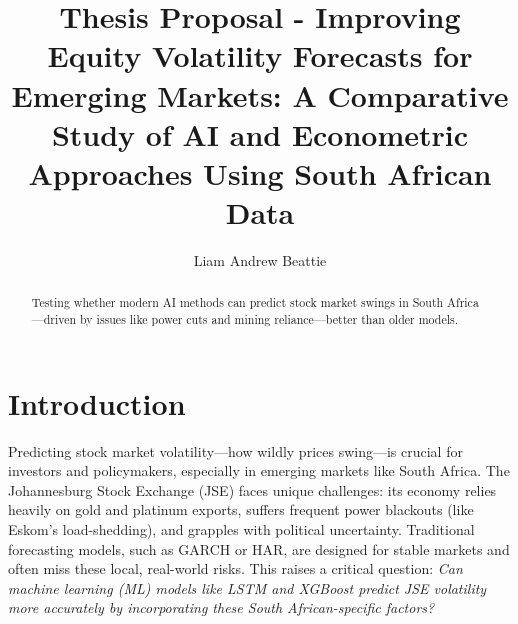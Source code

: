 \documentclass[11pt,preprint]{elsarticle}
\numberwithin{equation}{section}
\numberwithin{figure}{section}
\numberwithin{table}{section}
\begin{document}
\begin{frontmatter}  %

\title{Thesis Proposal - Improving Equity Volatility Forecasts for
Emerging Markets: A Comparative Study of AI and Econometric Approaches
Using South African Data}





\author[Add1]{Liam Andrew Beattie}





\address[Add1]{Stellenbosch University, South Africa}


\begin{abstract}
\small{
Testing whether modern AI methods can predict stock market swings in
South Africa---driven by issues like power cuts and mining
reliance---better than older models.
}
\end{abstract}

\vspace{1cm}





\vspace{0.5cm}

\end{frontmatter}

\setcounter{footnote}{0}



\pagestyle{fancy}
\chead{}
\rhead{}
\lfoot{}
\lhead{}
\cfoot{}


\headsep 35pt %




\section{\texorpdfstring{Introduction
\label{Introduction}}{Introduction }}\label{introduction}

Predicting stock market volatility---how wildly prices swing---is
crucial for investors and policymakers, especially in emerging markets
like South Africa. The Johannesburg Stock Exchange (JSE) faces unique
challenges: its economy relies heavily on gold and platinum exports,
suffers frequent power blackouts (like Eskom's load-shedding), and
grapples with political uncertainty. Traditional forecasting models,
such as GARCH or HAR, are designed for stable markets and often miss
these local, real-world risks. This raises a critical question:
\emph{Can machine learning (ML) models like LSTM and XGBoost predict JSE
volatility more accurately by incorporating these South African-specific
factors?}
\end{document}
